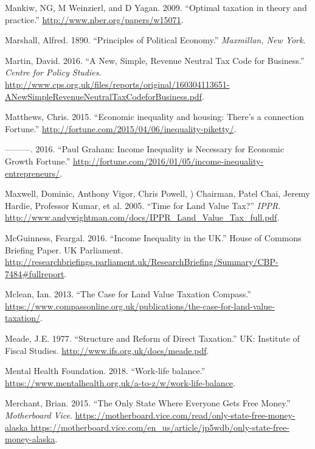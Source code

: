 \documentclass[]{tufte-handout}
\begin{document}
\leavevmode\hypertarget{ref-Mankiw2009}{}%
Mankiw, NG, M Weinzierl, and D Yagan. 2009. ``Optimal taxation in theory
and practice.'' \url{http://www.nber.org/papers/w15071}.

\leavevmode\hypertarget{ref-marshall1890principles}{}%
Marshall, Alfred. 1890. ``Principles of Political Economy.''
\emph{Maxmillan, New York}.

\leavevmode\hypertarget{ref-Martin}{}%
Martin, David. 2016. ``A New, Simple, Revenue Neutral Tax Code for
Business.'' \emph{Centre for Policy Studies}.
\url{http://www.cps.org.uk/files/reports/original/160304113651-ANewSimpleRevenueNeutralTaxCodeforBusiness.pdf}.

\leavevmode\hypertarget{ref-Matthews}{}%
Matthews, Chris. 2015. ``Economic inequality and housing: There's a
connection \textbar{} Fortune.''
\url{http://fortune.com/2015/04/06/inequality-piketty/}.

\leavevmode\hypertarget{ref-Matthews2016}{}%
---------. 2016. ``Paul Graham: Income Inequality is Necessary for
Economic Growth \textbar{} Fortune.''
\url{http://fortune.com/2016/01/05/income-inequality-entrepreneurs/}.

\leavevmode\hypertarget{ref-Maxwell}{}%
Maxwell, Dominic, Anthony Vigor, Chris Powell, ) Chairman, Patel Chai,
Jeremy Hardie, Professor Kumar, et al. 2005. ``Time for Land Value
Tax?'' \emph{IPPR}.
\url{http://www.andywightman.com/docs/IPPR_Land_Value_Tax_full.pdf}.

\leavevmode\hypertarget{ref-McGuinness2016}{}%
McGuinness, Feargal. 2016. ``Income Inequality in the UK.'' House of
Commons Briefing Paper. UK Parliament.
\url{http://researchbriefings.parliament.uk/ResearchBriefing/Summary/CBP-7484\#fullreport}.

\leavevmode\hypertarget{ref-Mclean2013}{}%
Mclean, Ian. 2013. ``The Case for Land Value Taxation \textbar{}
Compass.''
\url{https://www.compassonline.org.uk/publications/the-case-for-land-value-taxation/}.

\leavevmode\hypertarget{ref-Meade1977}{}%
Meade, J.E. 1977. ``Structure and Reform of Direct Taxation.'' UK:
Institute of Fiscal Studies. \url{http://www.ifs.org.uk/docs/meade.pdf}.

\leavevmode\hypertarget{ref-MentalHealthFoundation2018}{}%
Mental Health Foundation. 2018. ``Work-life balance.''
\url{https://www.mentalhealth.org.uk/a-to-z/w/work-life-balance}.

\leavevmode\hypertarget{ref-BrianMerchant2015}{}%
Merchant, Brian. 2015. ``The Only State Where Everyone Gets Free
Money.'' \emph{Motherboard Vice}.
\href{https://motherboard.vice.com/read/only-state-free-money-alaska\%20https://motherboard.vice.com/en_us/article/jp5wdb/only-state-free-money-alaska}{https://motherboard.vice.com/read/only-state-free-money-alaska https://motherboard.vice.com/en\_us/article/jp5wdb/only-state-free-money-alaska}.
\end{document}
